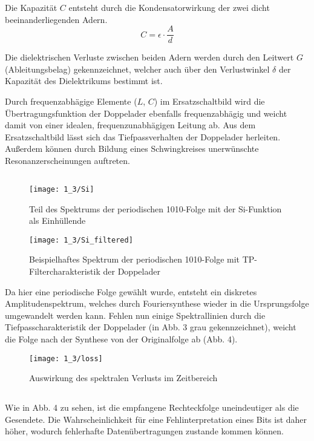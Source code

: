 \documentclass[a4paper, 12pt]{article}
\begin{document}
Die Kapazität $C$ entsteht durch die Kondensatorwirkung der zwei dicht
beeinanderliegenden Adern.
$$ C = \epsilon \cdot \frac{A}{d}$$

Die dielektrischen Verluste zwischen beiden Adern werden durch den Leitwert $G$
(Ableitungsbelag) gekennzeichnet, welcher auch über den Verlustwinkel $\delta$
der Kapazität des Dielektrikums bestimmt ist.

Durch frequenzabhägige Elemente ($L$, $C$) im Ersatzschaltbild wird die
Übertragungsfunktion der Doppelader ebenfalls frequenzabhägig und weicht damit
von einer idealen, frequenzunabhägigen Leitung ab. Aus dem
Ersatzschaltbild lässt sich das Tiefpassverhalten der Doppelader herleiten.
Außerdem können durch Bildung eines Schwingkreises unerwünschte Resonanzerscheinungen auftreten.

\subsection{}

\begin{figure}[H]
	\texttt{[image: 1\_3/Si]}
  \caption{Teil des Spektrums der periodischen 1010-Folge mit der Si-Funktion als Einhüllende}
\end{figure}

\begin{figure}[H]
	\texttt{[image: 1\_3/Si\_filtered]}
  \caption{Beispielhaftes Spektrum der periodischen 1010-Folge mit TP-Filtercharakteristik der
    Doppelader}
\end{figure}


Da hier eine periodische Folge gewählt wurde, entsteht ein diskretes
Amplitudenspektrum, welches durch Fouriersynthese wieder in die Ursprungsfolge
umgewandelt werden kann. Fehlen nun einige Spektrallinien  durch die
Tiefpasscharakteristik der Doppelader (in Abb. 3 grau gekennzeichnet), weicht die Folge nach
der Synthese von der Originalfolge ab (Abb. 4).

\begin{figure}[H]
	\texttt{[image: 1\_3/loss]}
  \caption{ Auswirkung des spektralen Verlusts im Zeitbereich }
\end{figure}


\subsection{}

Wie in Abb. 4 zu sehen, ist die empfangene Rechteckfolge uneindeutiger als die
Gesendete. Die Wahrscheinlichkeit für eine Fehlinterpretation eines Bits ist
daher höher, wodurch fehlerhafte Datenübertragungen zustande kommen können.
\end{document}
